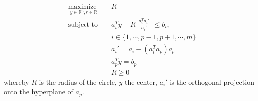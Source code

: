 \documentclass{article}
\def\R{\ensuremath{\mathbb{R}}}
\begin{document}
\begin{equation}
        \begin{aligned}
                &\underset{y \in \R^n, r \in \R}{\text{maximize }}&&R\\
                &\text{subject to }&& a_i^T y + R
                 \frac{a_i^T a_i'}{\|a_i'\|}\leq b_i,\\
                 &&&i\in \{1,\cdots,p-1,p+1,\cdots,m\}\\
                &&& a_i' = a_i - (a_i^Ta_p)a_p\\
                &&& a_p^Ty = b_p\\
                &&& R \geq 0
        \end{aligned}
\end{equation}
        whereby $R$ is the radius of the circle, $y$ the center, $a_i'$ is the
                orthogonal projection onto the hyperplane of $a_p$.





 
\end{document}
